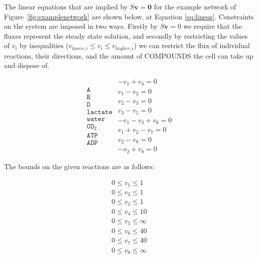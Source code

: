\documentclass[a4paper,12pt]{article}
\begin{document}
	The linear equations that are implied by $S\mathbf{v}=\mathbf{0}$ for the example network of Figure~\ref{fig:examplenetwork} are shown below, at Equation \ref{eq:lineqs}. Constraints on the system are imposed in two ways. Firstly by $S\mathbf{v}=0$ we require that the fluxes represent the steady state solution, and secondly by restricting the values of $v_i$ by inequalities ($v_{lower,i}\leq v_i \leq v_{higher,i}$) we can restrict the flux of individual reactions, their directions, and the amount of COMPOUNDS the cell can take up and dispose of. 
	

	\begin{equation}\label{eq:lineqs}
	\begin{matrix}
		\texttt{A}   \\
		\texttt{B}\\
		\texttt{D}\\
		\texttt{lactate}\\
		\texttt{water}\\
		\texttt{CO}_2\\
		\texttt{ATP}\\
		\texttt{ADP}
	\end{matrix}
		\begin{matrix}
			- v_1+v_4=0 \\
			v_1-v_2=0 \\
			v_2-v_3=0 \\
			v_3-v_5=0 \\
			-v_1-v_2+v_6=0 \\
			v_1+v_2-v_7=0 \\
			v_2-v_8=0 \\
			-v_2+v_8=0
		\end{matrix}
	\end{equation}

	The bounds on the given reactions are as follows: 

	\begin{equation}\label{eq:bounds}
		\begin{matrix}
			0\leq v_1 \leq 1\\
			0\leq v_2 \leq 1\\
			0\leq v_3 \leq 1\\
			0\leq v_4 \leq 10\\
			0\leq v_5 \leq \infty \\
			0\leq v_6 \leq 40\\
			0\leq v_7 \leq 40\\
			0\leq v_8 \leq \infty\\
		\end{matrix}
	\end{equation}
\end{document}

